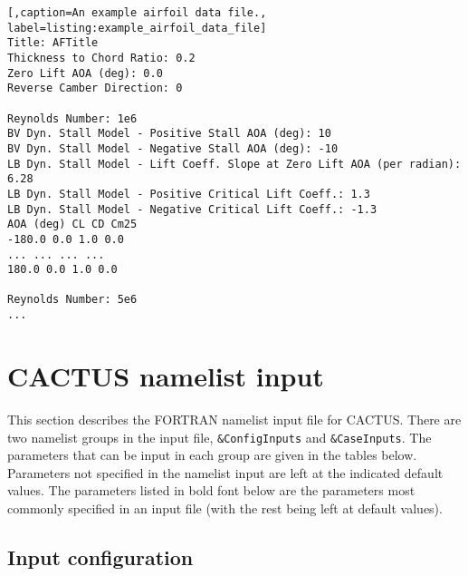 \begin{lstlisting}[,caption=An example airfoil data file., label=listing:example_airfoil_data_file]
Title: AFTitle
Thickness to Chord Ratio: 0.2
Zero Lift AOA (deg): 0.0
Reverse Camber Direction: 0

Reynolds Number: 1e6
BV Dyn. Stall Model - Positive Stall AOA (deg): 10
BV Dyn. Stall Model - Negative Stall AOA (deg): -10
LB Dyn. Stall Model - Lift Coeff. Slope at Zero Lift AOA (per radian): 6.28
LB Dyn. Stall Model - Positive Critical Lift Coeff.: 1.3
LB Dyn. Stall Model - Negative Critical Lift Coeff.: -1.3
AOA (deg) CL CD Cm25
-180.0 0.0 1.0 0.0
... ... ... ...
180.0 0.0 1.0 0.0

Reynolds Number: 5e6
... 
\end{lstlisting}

\section{CACTUS namelist input}
This section describes the FORTRAN namelist input file for CACTUS. There are two namelist groups in the input file, \texttt{\&ConfigInputs} and \texttt{\&CaseInputs}. The parameters that can be input in each group are given in the tables below. Parameters not specified in the namelist input are left at the indicated default values. The parameters listed in bold font below are the parameters most commonly specified in an input file (with the rest being left at default values). 
\subsection{Input configuration}


